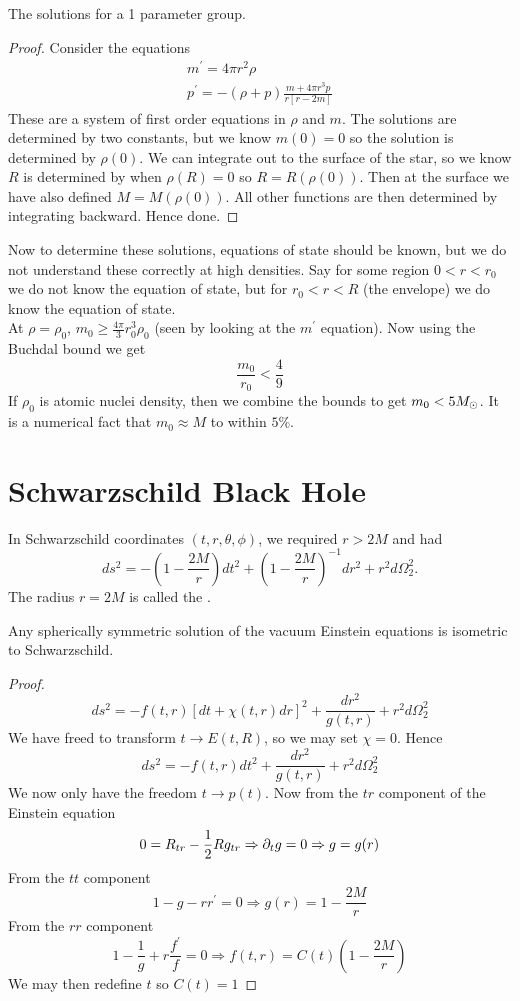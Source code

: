 \documentclass{article}
\begin{document}
\begin{theorem}
The solutions for a 1 parameter group. 
\end{theorem}
\begin{proof}
Consider the equations 
\begin{align*}
    m^\prime = 4\pi r^2 \rho \\
    p^\prime = -(\rho + p) \frac{m+4\pi r^3 p}{r[r-2m]}
\end{align*}
These are a system of first order equations in $\rho$ and $m$. The solutions are determined by two constants, but we know $m(0)=0$ so the solution is determined by $\rho(0)$. We can integrate out to the surface of the star, so we know $R$ is determined by when $\rho(R) = 0$ so $R=R(\rho(0))$. Then at the surface we have also defined $M=M(\rho(0))$. All other functions are then determined by integrating backward. Hence done. 
\end{proof}

Now to determine these solutions, equations of state should be known, but we do not understand these correctly at high densities. Say for some region $0<r<r_0$ we do not know the equation of state, but for $r_0 <r < R$ (the envelope) we do know the equation of state. \\
At $\rho=\rho_0$, $m_0 \geq \frac{4\pi}{3} r_0^3 \rho_0$ (seen by looking at the $m^\prime$ equation). Now using the Buchdal bound we get 
\[
\frac{m_0}{r_0} < \frac{4}{9}
\]
If $\rho_0$ is atomic nuclei density, then we combine the bounds to get $m_0 < 5 M_\odot$. It is a numerical fact that $m_0 \approx M $ to within $5\%$. 

\section{Schwarzschild Black Hole}
In Schwarzschild coordinates $(t,r,\theta,\phi)$, we required $r>2M$ and had 
\[
ds^2 = -(1-\frac{2M}{r}) dt^2 + (1-\frac{2M}{r})^{-1} dr^2 + r^2 d\Omega_2^2.
\]
The radius $r=2M$ is called the . 
\begin{theorem}[Birkhoff]
Any spherically symmetric solution of the vacuum Einstein equations is isometric to Schwarzschild. 
\end{theorem}
\begin{proof}
\[
ds^2 = -f(t,r)[dt + \chi(t,r)dr]^2 + \frac{dr^2}{g(t,r)} + r^2 d\Omega^2_2
\]
We have freed to transform $t \to E(t,R)$, so we may set $\chi=0$. Hence 
\[
ds^2 = -f(t,r)dt^2 + \frac{dr^2}{g(t,r)} + r^2 d\Omega^2_2
\]
We now only have the freedom $t \to p(t)$. Now from the $tr$ component of the Einstein equation
\[
0 = R_{tr}- \frac{1}{2} R g_{tr} \Rightarrow \partial_t g = 0 \Rightarrow g=g(r)
\]
From the $tt$ component
\[
1-g-rr^\prime = 0 \Rightarrow g(r) = 1-\frac{2M}{r}
\]
From the $rr$ component 
\[
1-\frac{1}{g} + r\frac{f^\prime}{f} = 0 \Rightarrow f(t,r) = C(t)(1-\frac{2M}{r})
\]
We may then redefine $t$ so $C(t)=1$
\end{proof}
\end{document}
